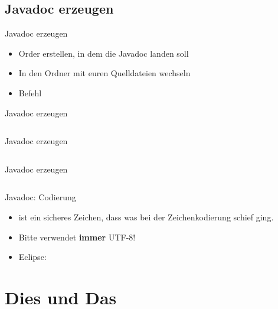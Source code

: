 \documentclass[usepdftitle=false,hyperref={pdfpagelabels=false}]{beamer}
\newcommand{\quem}{\tikz[baseline=(wi.base)]{\node[fill=black,rotate=45,inner sep=1.5mm] {};%
\node[ font=\color{white}] (wi) {?};}}
\begin{document}
\subsection{Javadoc erzeugen}
\begin{frame}{Javadoc erzeugen}
    \begin{itemize}
        \item Order erstellen, in dem die Javadoc landen soll
        \item In den Ordner mit euren Quelldateien wechseln
        \item Befehl 
    \end{itemize}
\end{frame}
\begin{frame}{Javadoc erzeugen}
    \inputminted[linenos=true, numbersep=5pt, tabsize=4, firstline=1, lastline=30, fontsize=\tiny]{console}{javadoc.sh-session}
\end{frame}
\begin{frame}{Javadoc erzeugen}
    \inputminted[linenos=true, numbersep=5pt, tabsize=4, firstline=31, firstnumber=31, lastline=59, fontsize=\tiny]{console}{javadoc.sh-session}
\end{frame}
\begin{frame}{Javadoc erzeugen}
    \inputminted[linenos=true, numbersep=5pt, tabsize=4, firstline=60, firstnumber=60, lastline=82, fontsize=\tiny]{console}{javadoc.sh-session}
\end{frame}
\begin{frame}{Javadoc: Codierung}
    \begin{itemize}[<+->]
        \item \quem{} ist ein sicheres Zeichen, dass was bei der 
              Zeichenkodierung schief ging.
        \item Bitte verwendet \textbf{immer} UTF-8!
        \item Eclipse: 
    \end{itemize}
\end{frame}

\section{Dies und Das}
\end{document}
